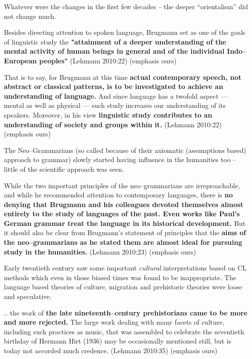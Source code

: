 Whatever were the changes in the first few decades – the deeper “orientalism” did not change much.

\begin{myquote}
Besides directing attention to spoken language, Brugmann set as one of the goals of linguistic study the \textbf{"attainment of a deeper understanding of the mental activity of human beings in general and of the individual Indo–European peoples"} (Lehmann 2010:22) (emphasis ours)
\end{myquote}

\begin{myquote}
That is to say, for Brugmann at this time \textbf{actual contemporary speech, not abstract or classical patterns, is to be investigated to achieve an understanding of language.} And since language has a twofold aspect — mental as well as physical — such study increases our understanding of its speakers. Moreover, in his view \textbf{linguistic study contributes to an understanding of society and groups within it.} (Lehmann 2010:22) (emphasis ours)
\end{myquote}

The Neo–Grammarians (so called because of their axiomatic (assumptions based) approach to grammar) slowly started having influence in the humanities too – little of the scientific approach was seen.

\begin{myquote}
While the two important principles of the neo–grammarians are irreproachable, and while he recommended attention to contemporary languages, there is \textbf{no denying that Brugmann and his colleagues devoted themselves almost entirely to the study of languages of the past. Even works like Paul's German grammar treat the language in its historical development.} But it should also be clear from Brugmann's statement of principles that the \textbf{aims of the neo–grammarians as he stated them are almost ideal for pursuing study in the humanities.} (Lehmann 2010:23) (emphasis ours)
\end{myquote}

Early twentieth century saw some important \textit{cultural} interpretations based on CL methods which even in those biased times was found to be inappropriate. The language based theories of culture, migration and prehistoric theories were loose and speculative.

\begin{myquote}
.. the work of \textbf{the late nineteenth–century prehistorians came to be more and more rejected.} The large work dealing with many facets of culture, including such practices as music, that was assembled to celebrate the seventieth birthday of Hermann Hirt (1936) may be occasionally mentioned still, but is today not accorded much credence. (Lehmann 2010:35) (emphasis ours)
\end{myquote}

